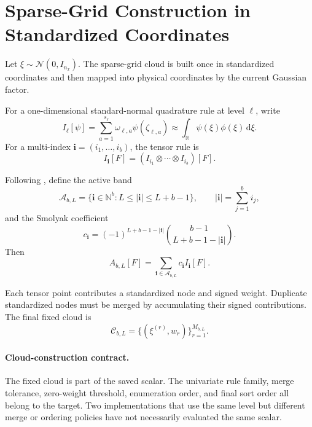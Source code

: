 \documentclass[11pt]{article}
\numberwithin{equation}{section}
\newcommand{\R}{\mathbb R}
\newcommand{\N}{\mathcal N}
\newcommand{\dd}{\,\mathrm d}
\begin{document}
\section{Sparse-Grid Construction in Standardized Coordinates}
\label{sec:sparse-grid-construction}

Let \(\xi\sim\N(0,I_{n_x})\).  The sparse-grid cloud is built once in
standardized coordinates and then mapped into physical coordinates by the
current Gaussian factor.

For a one-dimensional standard-normal quadrature rule at level \(\ell\), write
\begin{equation}
  I_\ell[\psi]
  =
  \sum_{a=1}^{s_\ell}\omega_{\ell,a}\psi(\zeta_{\ell,a})
  \approx
  \int_\R \psi(\xi)\phi(\xi)\dd\xi.
  \label{eq:univariate-rule}
\end{equation}
For a multi-index \(\mathbf i=(i_1,\ldots,i_b)\), the tensor rule is
\begin{equation}
  I_{\mathbf i}[F] = (I_{i_1}\otimes\cdots\otimes I_{i_b})[F].
  \label{eq:tensor-rule}
\end{equation}

Following \citet[Eq.~26--29]{jia2012sparsegrid}, define the active band
\begin{equation}
  \mathcal A_{b,L}
  =
  \{\mathbf i\in\mathbb N^b: L\le |\mathbf i|\le L+b-1\},
  \qquad
  |\mathbf i|=\sum_{j=1}^b i_j,
  \label{eq:active-band}
\end{equation}
and the Smolyak coefficient
\begin{equation}
  c_{\mathbf i}
  =
  (-1)^{L+b-1-|\mathbf i|}
  \binom{b-1}{L+b-1-|\mathbf i|}.
  \label{eq:smolyak-coeff}
\end{equation}
Then
\begin{equation}
  A_{b,L}[F]
  =
  \sum_{\mathbf i\in\mathcal A_{b,L}} c_{\mathbf i}I_{\mathbf i}[F].
  \label{eq:smolyak-rule}
\end{equation}

Each tensor point contributes a standardized node and signed weight.  Duplicate
standardized nodes must be merged by accumulating their signed contributions.
The final fixed cloud is
\begin{equation}
  \mathcal C_{b,L} = \{(\xi^{(r)},w_r)\}_{r=1}^{M_{b,L}}.
  \label{eq:fixed-cloud}
\end{equation}

\paragraph{Cloud-construction contract.}
The fixed cloud is part of the saved scalar.  The univariate rule family, merge
tolerance, zero-weight threshold, enumeration order, and final sort order all
belong to the target.  Two implementations that use the same level but different
merge or ordering policies have not necessarily evaluated the same scalar.
\end{document}
